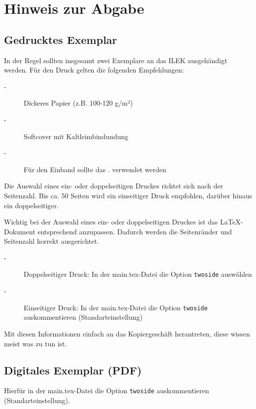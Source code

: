 \newpage

\section*{Hinweis zur Abgabe}

\subsection*{Gedrucktes Exemplar}

In der Regel sollten insgesamt zwei Exemplare an das ILEK ausgehändigt werden. Für den Druck gelten die folgenden Empfehlungen:

\begin{description}
	\item[-] Dickeres Papier (z.B. 100-120 g/m²)
	\item[-] Softcover mit Kaltleimbindundung
	\item[-] Für den Einband sollte das . verwendet werden 
\end{description}

Die Auswahl eines ein- oder doppelseitigen Druckes richtet sich nach der Seitenzahl. Bis ca. 50 Seiten wird ein einseitiger Druck empfohlen, darüber hinaus ein doppelseitiger.

Wichtig bei der Auswahl eines ein- oder doppelseitigen Druckes ist das LaTeX-Dokument entsprechend anzupassen. Dadurch werden die Seitenränder und Seitenzahl korrekt ausgerichtet.

\begin{description}
	\item[-] Doppelseitiger Druck: In der main.tex-Datei die Option \lstinline[basicstyle=\ttfamily]|twoside| auswählen
	\item[-] Einseitiger Druck: In der main.tex-Datei die Option \lstinline[basicstyle=\ttfamily]|twoside| auskommentieren (Standarteinstellung)
\end{description}

Mit diesen Informationen einfach an das Kopiergeschäft herantreten, diese wissen meist was zu tun ist.

\subsection*{Digitales Exemplar (PDF)}

Hierfür in der main.tex-Datei die Option \lstinline[basicstyle=\ttfamily]|twoside| auskommentieren (Standarteinstellung).

